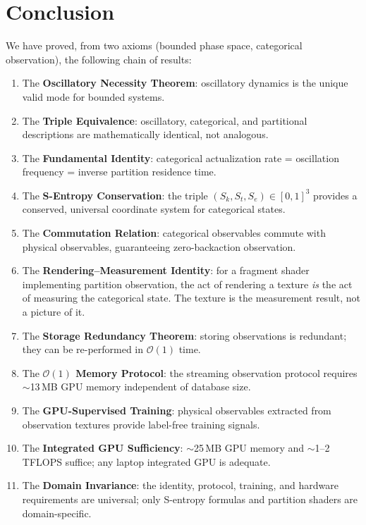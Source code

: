 \documentclass[11pt,twocolumn,a4paper]{article}
\newcommand{\Sk}{S_k}
\newcommand{\St}{S_t}
\newcommand{\Se}{S_e}
\newcommand{\BigO}{\mathcal{O}}
\begin{document}
\section{Conclusion}
\label{sec:conclusion}

We have proved, from two axioms (bounded phase space, categorical
observation), the following chain of results:

\begin{enumerate}[leftmargin=*,itemsep=2pt]
\item The \textbf{Oscillatory Necessity Theorem}: oscillatory
  dynamics is the unique valid mode for bounded systems.
\item The \textbf{Triple Equivalence}: oscillatory, categorical,
  and partitional descriptions are mathematically identical, not
  analogous.
\item The \textbf{Fundamental Identity}: categorical actualization
  rate = oscillation frequency = inverse partition residence time.
\item The \textbf{S-Entropy Conservation}: the triple
  $(\Sk, \St, \Se) \in [0,1]^3$ provides a conserved, universal
  coordinate system for categorical states.
\item The \textbf{Commutation Relation}: categorical observables
  commute with physical observables, guaranteeing zero-backaction
  observation.
\item The \textbf{Rendering--Measurement Identity}: for a fragment
  shader implementing partition observation, the act of rendering
  a texture \emph{is} the act of measuring the categorical state.
  The texture is the measurement result, not a picture of it.
\item The \textbf{Storage Redundancy Theorem}: storing observations
  is redundant; they can be re-performed in $\BigO(1)$ time.
\item The \textbf{$\BigO(1)$ Memory Protocol}: the streaming
  observation protocol requires $\sim$13\,MB GPU memory independent
  of database size.
\item The \textbf{GPU-Supervised Training}: physical observables
  extracted from observation textures provide label-free training
  signals.
\item The \textbf{Integrated GPU Sufficiency}: $\sim$25\,MB
  GPU memory and $\sim$1--2\,TFLOPS suffice; any laptop integrated
  GPU is adequate.
\item The \textbf{Domain Invariance}: the identity, protocol,
  training, and hardware requirements are universal; only S-entropy
  formulas and partition shaders are domain-specific.
\end{enumerate}
\end{document}
